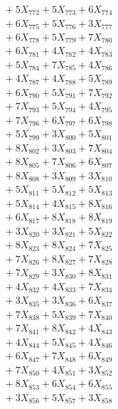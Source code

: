\documentclass[a4paper,10pt]{article}
\begin{document}
{\begin{align}
&\;  + 5 X_{772} + 5 X_{773} + 6 X_{774} \\[0.3ex]
&\;  + 6 X_{775} + 5 X_{776} + 3 X_{777} \\[0.3ex]
&\;  + 6 X_{778} + 5 X_{779} + 7 X_{780} \\[0.3ex]
&\;  + 6 X_{781} + 4 X_{782} + 4 X_{783} \\[0.3ex]
&\;  + 5 X_{784} + 7 X_{785} + 4 X_{786} \\[0.3ex]
&\;  + 4 X_{787} + 4 X_{788} + 5 X_{789} \\[0.5ex]\allowbreak
&\;  + 6 X_{790} + 5 X_{791} + 7 X_{792} \\[0.3ex]
&\;  + 7 X_{793} + 5 X_{794} + 4 X_{795} \\[0.3ex]
&\;  + 7 X_{796} + 6 X_{797} + 6 X_{798} \\[0.3ex]
&\;  + 5 X_{799} + 3 X_{800} + 5 X_{801} \\[0.3ex]
&\;  + 8 X_{802} + 3 X_{803} + 7 X_{804} \\[0.3ex]
&\;  + 8 X_{805} + 7 X_{806} + 6 X_{807} \\[0.3ex]
&\;  + 8 X_{808} + 3 X_{809} + 3 X_{810} \\[0.3ex]
&\;  + 5 X_{811} + 5 X_{812} + 5 X_{813} \\[0.3ex]
&\;  + 5 X_{814} + 4 X_{815} + 8 X_{816} \\[0.3ex]
&\;  + 6 X_{817} + 8 X_{818} + 8 X_{819} \\[0.5ex]\allowbreak
&\;  + 3 X_{820} + 3 X_{821} + 5 X_{822} \\[0.3ex]
&\;  + 8 X_{823} + 8 X_{824} + 7 X_{825} \\[0.3ex]
&\;  + 7 X_{826} + 8 X_{827} + 7 X_{828} \\[0.3ex]
&\;  + 7 X_{829} + 3 X_{830} + 8 X_{831} \\[0.3ex]
&\;  + 4 X_{832} + 4 X_{833} + 7 X_{834} \\[0.3ex]
&\;  + 3 X_{835} + 3 X_{836} + 6 X_{837} \\[0.3ex]
&\;  + 7 X_{838} + 5 X_{839} + 7 X_{840} \\[0.3ex]
&\;  + 7 X_{841} + 8 X_{842} + 4 X_{843} \\[0.3ex]
&\;  + 4 X_{844} + 5 X_{845} + 4 X_{846} \\[0.3ex]
&\;  + 6 X_{847} + 7 X_{848} + 6 X_{849} \\[0.5ex]\allowbreak
&\;  + 7 X_{850} + 4 X_{851} + 3 X_{852} \\[0.3ex]
&\;  + 8 X_{853} + 6 X_{854} + 6 X_{855} \\[0.3ex]
&\;  + 3 X_{856} + 5 X_{857} + 3 X_{858} \\[0.3ex]

\end{align}}
\end{document}
